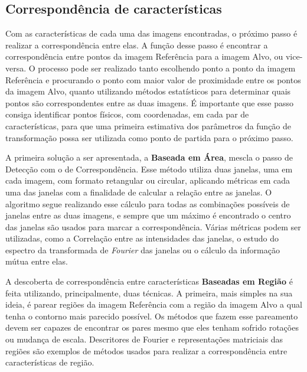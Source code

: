 \subsection{Correspondência de características}

    Com as características de cada uma das imagens encontradas, o próximo passo é realizar a correspondência entre elas.
A função desse passo é encontrar a correspondência entre pontos da imagem Referência para a imagem Alvo, ou vice-versa.
O processo pode ser realizado tanto escolhendo ponto a ponto da imagem Referência e procurando o ponto com maior valor
de proximidade entre os pontos da imagem Alvo, quanto utilizando métodos estatísticos para determinar quais pontos são
correspondentes entre as duas imagens. É importante que esse passo consiga identificar pontos físicos, com coordenadas,
em cada par de características, para que uma primeira estimativa dos parâmetros da função de transformação possa ser
utilizada como ponto de partida para o próximo passo.

    A primeira solução a ser apresentada, a \textbf{Baseada em Área}, mescla o passo de Detecção com o de
Correspondência. Esse método utiliza duas janelas, uma em cada imagem, com formato retangular ou circular, aplicando
métricas em cada uma das janelas com a finalidade de calcular a relação entre as janelas. O algoritmo segue realizando
esse cálculo para todas as combinações possíveis de janelas entre as duas imagens, e sempre que um máximo é encontrado
o centro das janelas são usados para marcar a correspondência. Várias métricas podem ser utilizadas, como a
Correlação entre as intensidades das janelas, o estudo do espectro da transformada de \textit{Fourier} das janelas ou
o cálculo da informação mútua entre elas.

    A descoberta de correspondência entre características \textbf{Baseadas em Região} é feita utilizando, principalmente, duas
técnicas. A primeira, mais simples na sua ideia, é parear regiões da imagem Referência com a região da imagem Alvo a
qual tenha o contorno mais parecido possível. Os métodos que fazem esse pareamento devem ser capazes de encontrar os
pares mesmo que eles tenham sofrido rotações ou mudança de escala. Descritores de Fourier e representações matriciais
das regiões são exemplos de métodos usados para realizar a correspondência entre características de região.

